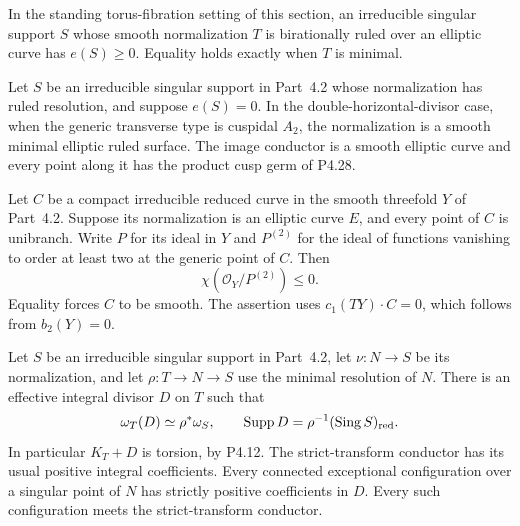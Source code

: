 
\begin{proposition}[P4.22]\hypertarget{tag-02WU}{}\label{night:P4.22}\label{stmt:P4.22}


In the standing torus-fibration setting of this section, an irreducible singular support
$S$ whose smooth normalization $T$ is birationally ruled
over an elliptic curve has $e(S)\ge0$. Equality holds
exactly when $T$ is minimal.
\end{proposition}

\begin{proposition}[P4.29]\hypertarget{tag-02X1}{}\label{night:P4.29}\label{stmt:P4.29}


Let $S$ be an irreducible singular support
in Part~4.2 whose normalization has ruled
resolution, and suppose $e(S)=0$.
In the double-horizontal-divisor case,
when the generic transverse type is
cuspidal $A_2$, the normalization is
a smooth minimal elliptic ruled surface.
The image conductor is a smooth elliptic
curve and every point along it has the
product cusp germ of P4.28.
\end{proposition}

\begin{proposition}[P4.30]\hypertarget{tag-02X3}{}\label{night:P4.30}\label{stmt:P4.30}


Let $C$ be a compact irreducible reduced curve in the smooth
threefold $Y$ of Part~4.2. Suppose its normalization is an elliptic
curve $E$, and every point of $C$ is unibranch. Write $P$ for its
ideal in $Y$ and $P^{(2)}$ for the ideal of functions vanishing to
order at least two at the generic point of $C$. Then
\[
 \chi(\mathcal O_Y/P^{(2)})\le0.
\]
Equality forces $C$ to be smooth. The assertion uses
$c_1(TY)\cdot C=0$, which follows from $b_2(Y)=0$.
\end{proposition}

\begin{proposition}[P4R.6]\hypertarget{tag-02YI}{}\label{night:P4R.6}\label{stmt:P4R.6}


Let $S$ be an irreducible singular support in
Part~4.2, let $\nu:N\to S$ be its normalization,
and let $\rho:T\to N\to S$ use the minimal
resolution of $N$. There is an effective integral
divisor $D$ on $T$ such that
\[
 \omega_T(D)\simeq\rho^*\omega_S,
 \qquad \operatorname{Supp}D
       =\rho^{-1}(\operatorname{Sing}S)_{\rm red}.
\]
In particular $K_T+D$ is torsion, by P4.12.
The strict-transform conductor has its usual
positive integral coefficients. Every connected
exceptional configuration over a singular point
of $N$ has strictly positive coefficients in $D$.
Every such configuration meets the strict-transform
conductor.
\end{proposition}

